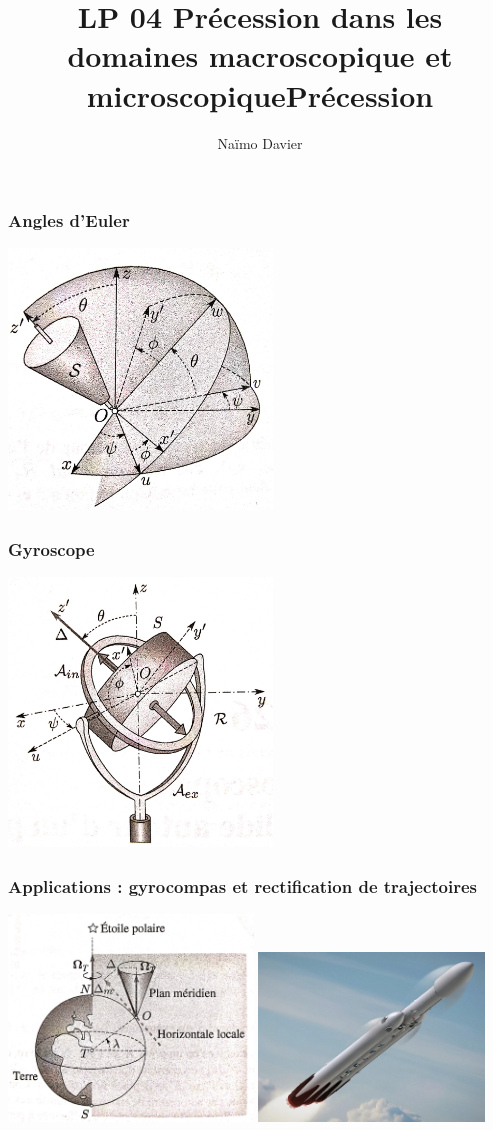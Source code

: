 \documentclass{beamer}
\title{LP 04 Précession dans les domaines macroscopique et microscopique}
\author{Naïmo Davier}
\institute{Université Paul sabatier}
\begin{document}
	
\begin{frame}
	\titlepage
\end{frame}

\addtocounter{framenumber}{-1}
\title{Précession}

\begin{frame}
\frametitle{Angles d'Euler}
\centerline{\includegraphics[width=7cm]{euler}}
\end{frame}

\begin{frame}
\frametitle{Gyroscope}
\centerline{\includegraphics[width=7cm]{gyroscope}}
\end{frame}

\begin{frame}
\frametitle{Applications : gyrocompas et rectification de trajectoires}
\centerline{\includegraphics[width=6.5cm]{compas}
			\includegraphics[width=6cm]{fusee}}
\end{frame}
\end{document}
